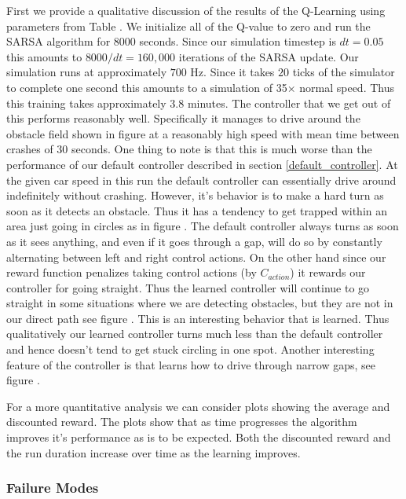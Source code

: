\documentclass{article}
\begin{document}
First we provide a qualitative discussion of the results of the Q-Learning using parameters from Table . We initialize all of the Q-value to zero and run the SARSA algorithm for 8000 seconds. Since our simulation timestep is $dt = 0.05$ this amounts to $8000/dt = 160,000$ iterations of the SARSA update. Our simulation runs at approximately $700$ Hz. Since it takes $20$ ticks of the simulator to complete one second this amounts to a simulation of 35$\times$ normal speed. Thus this training takes approximately $3.8$ minutes. The controller that we get out of this performs reasonably well. Specifically it manages to drive around the obstacle field shown in figure  at a reasonably high speed with mean time between crashes of  30 seconds. One thing to note is that this is much worse than the performance of our default controller described in section \ref{default_controller}. At the given car speed in this run the default controller can essentially drive around indefinitely without crashing. However, it's behavior is to make a hard turn as soon as it detects an obstacle. Thus it has a tendency to get trapped within an area just going in circles as in figure . The default controller always turns as soon as it sees anything, and even if it goes through a gap, will do so by constantly alternating between left and right control actions. On the other hand since our reward function penalizes taking control actions (by $C_{action}$) it rewards our controller for going straight. Thus the learned controller will continue to go straight in some situations where we are detecting obstacles, but they are not in our direct path see figure . This is an interesting behavior that is learned. Thus qualitatively our learned controller turns much less than the default controller and hence doesn't tend to get stuck circling in one spot. Another interesting feature of the controller is that learns how to drive through narrow gaps, see figure .

For a more quantitative analysis we can consider plots showing the average and discounted reward. The plots show that as time progresses the algorithm improves it's performance as is to be expected. Both the discounted reward and the run duration increase over time as the learning improves. 


\subsubsection{Failure Modes}
\label{failure_modes}
\end{document}
